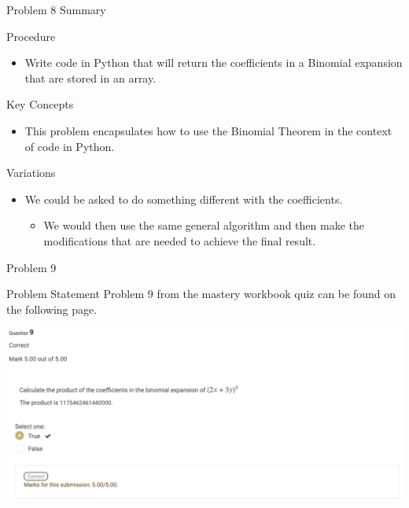 \begin{summary}{Problem 8 Summary}
    \begin{statement}{Procedure}
        \begin{itemize}
            \item Write code in Python that will return the coefficients in a Binomial expansion that are stored in an array.
        \end{itemize}
    \end{statement}
    \begin{statement}{Key Concepts}
        \begin{itemize}
            \item This problem encapsulates how to use the Binomial Theorem in the context of code in Python.
        \end{itemize}
    \end{statement}
    \begin{statement}{Variations}
        \begin{itemize}
            \item We could be asked to do something different with the coefficients.
            \begin{itemize}
                \item We would then use the same general algorithm and then make the modifications that are needed to achieve the final result.
            \end{itemize}
        \end{itemize}
    \end{statement}
\end{summary}

\begin{problem}{Problem 9}
    \begin{statement}{Problem Statement}
        Problem 9 from the mastery workbook quiz can be found on the following page.
    \end{statement}
    \begin{highlight}[Solution]
        \begin{center}
            \includegraphics[width = 1.0\textwidth]{Images/Problem 9.png}
        \end{center}
    \end{highlight}
\end{problem}

